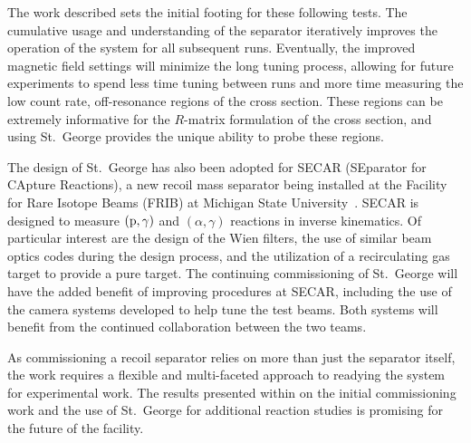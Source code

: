 The work described sets the initial footing for these following tests.
The cumulative usage and understanding of the separator iteratively
improves the operation of the system for all subsequent runs.
Eventually, the improved magnetic field settings will minimize the long
tuning process, allowing for future experiments to spend less time
tuning between runs and more time measuring the low count rate,
off-resonance regions of the cross section. These regions can be
extremely informative for the $R$-matrix formulation of the cross
section, and using St.\ George provides the unique ability to probe
these regions.

The design of St.\ George has also been adopted for SECAR (SEparator for
CApture Reactions), a new recoil mass separator being installed at the
Facility for Rare Isotope Beams (FRIB) at Michigan State
University~\cite{Berg2018}. SECAR is designed to measure
$({\rm p},\gamma)$ and $(\alpha,\gamma)$ reactions in inverse
kinematics. Of particular interest are the design of the Wien filters,
the use of similar beam optics codes during the design process, and the
utilization of a recirculating gas target to provide a pure target. The
continuing commissioning of St.\ George will have the added benefit of
improving procedures at SECAR, including the use of the camera systems
developed to help tune the test beams. Both systems will benefit from
the continued collaboration between the two teams.

As commissioning a recoil separator relies on more than just the
separator itself, the work requires a flexible and multi-faceted
approach to readying the system for experimental work. The results
presented within on the initial commissioning work and the use of St.\
George for additional reaction studies is promising for the future of
the facility.
